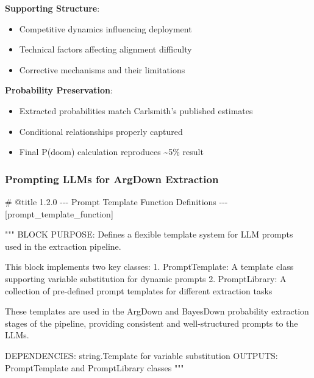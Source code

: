 \documentclass[
  11pt,
  letterpaper,
]{book}
\newenvironment{Shaded}{\begin{snugshade}}{\end{snugshade}}
\newcommand{\CommentTok}[1]{\textcolor[rgb]{0.37,0.37,0.37}{#1}}
\providecommand{\tightlist}{%
  \setlength{\itemsep}{0pt}\setlength{\parskip}{0pt}}
\begin{document}
\begin{landscape}
\textbf{Supporting Structure}:

\begin{itemize}
\tightlist
\item
  Competitive dynamics influencing deployment
\item
  Technical factors affecting alignment difficulty
\item
  Corrective mechanisms and their limitations
\end{itemize}

\textbf{Probability Preservation}:

\begin{itemize}
\tightlist
\item
  Extracted probabilities match Carlsmith's published estimates
\item
  Conditional relationships properly captured
\item
  Final P(doom) calculation reproduces \textasciitilde5\% result
\end{itemize}

\subsubsection*{Prompting LLMs for ArgDown
Extraction}\label{prompting-llms-for-argdown-extraction}

\label{prompt_template_function}
\begin{Shaded}
\begin{Highlighting}[]
\CommentTok{\# @title 1.2.0 {-}{-}{-} Prompt Template Function Definitions {-}{-}{-} [prompt\_template\_function]}

\CommentTok{"""}
\CommentTok{BLOCK PURPOSE: Defines a flexible template system for LLM prompts used in the extraction pipeline.}

\CommentTok{This block implements two key classes:}
\CommentTok{1. PromptTemplate: A template class supporting variable substitution for dynamic prompts}
\CommentTok{2. PromptLibrary: A collection of pre{-}defined prompt templates for different extraction tasks}

\CommentTok{These templates are used in the ArgDown and BayesDown probability extraction}
\CommentTok{stages of the pipeline, providing consistent and well{-}structured prompts to the LLMs.}

\CommentTok{DEPENDENCIES: string.Template for variable substitution}
\CommentTok{OUTPUTS: PromptTemplate and PromptLibrary classes}
\CommentTok{"""}


\end{Highlighting}
\end{Shaded}
\end{landscape}
\end{document}
